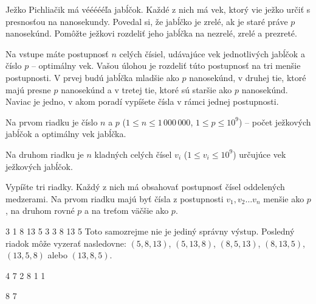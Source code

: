 




Ježko Pichliačik má véééééľa jabĺčok. Každé z nich má vek, ktorý vie ježko
určiť s presnosťou na nanosekundy. Povedal si, že jabĺčko je zrelé, ak je staré
práve $p$ nanosekúnd. Pomôžte ježkovi rozdeliť jeho jabĺčka na nezrelé, zrelé a
prezreté.


Na vstupe máte postupnosť $n$ celých čísiel, udávajúce vek jednotlivých jabĺčok
a číslo $p$ -- optimálny vek. Vašou úlohou je rozdeliť túto postupnosť na tri
menšie postupnosti. V prvej budú jabĺčka mladšie ako $p$ nanosekúnd, v druhej
tie, ktoré majú presne $p$ nanosekúnd a v tretej tie, ktoré sú staršie ako $p$
nanosekúnd. Naviac je jedno, v akom poradí vypíšete čísla v rámci jednej
postupnosti.


Na prvom riadku je číslo $n$ a $p$ ($1 \leq n \leq 1\,000\,000$, $1\leq p\leq
10^9$) -- počet ježkových jabĺčok a optimálny vek jabĺčka.

Na druhom riadku je $n$ kladných celých čísel $v_i$ ($1 \leq v_i \leq 10^9$)
určujúce vek ježkových jabĺčok.


Vypíšte tri riadky. Každý z nich má obsahovať postupnosť čísel oddelených
medzerami. Na prvom riadku majú byť čísla z postupnosti $v_1, v_2 \dots v_n$
menšie ako $p$, na druhom rovné $p$ a na treťom väčšie ako $p$.


 3
1 8 13 5 3
3
8 13 5
\komentar
Toto samozrejme nie je jediný správny výstup. Posledný riadok môže vyzerať
nasledovne: $(5, 8, 13)$, $(5, 13, 8)$, $(8, 5, 13)$, $(8, 13, 5)$, $(13, 5,
8)$ alebo $(13, 8, 5)$. 
\koniec

 4
7 2 8 1
 1

8 7
\koniec


